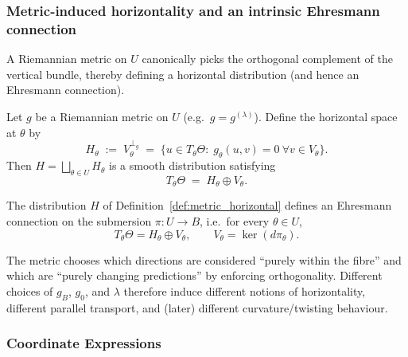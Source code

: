 
\subsubsection{Metric-induced horizontality and an intrinsic Ehresmann connection}

A Riemannian metric on $U$ canonically picks the orthogonal complement of the vertical bundle,
thereby defining a horizontal distribution (and hence an Ehresmann connection).

\begin{gdefn}
\label{def:metric_horizontal}
Let $g$ be a Riemannian metric on $U$ (e.g.\ $g=g^{(\lambda)}$).
Define the horizontal space at $\theta$ by
\[
H_\theta \;:=\; V_\theta^{\perp_g}
\;=\;\{u\in T_\theta\Theta:\; g_\theta(u,v)=0\ \forall v\in V_\theta\}.
\]
Then $H=\bigsqcup_{\theta\in U}H_\theta$ is a smooth distribution satisfying
\[
T_\theta\Theta \;=\; H_\theta \oplus V_\theta.
\]
\end{gdefn}

\begin{gprop}
\label{prop:metric_connection}
The distribution $H$ of Definition~\ref{def:metric_horizontal} defines an Ehresmann connection
on the submersion $\pi:U\to B$, i.e.\ for every $\theta\in U$,
\[
T_\theta\Theta = H_\theta \oplus V_\theta,
\qquad
V_\theta=\ker(d\pi_\theta).
\]
\end{gprop}

The metric chooses which directions are considered ``purely within the fibre'' and which are
``purely changing predictions'' by enforcing orthogonality.  Different choices of $g_B$, $g_0$,
and $\lambda$ therefore induce different notions of horizontality, different parallel transport,
and (later) different curvature/twisting behaviour.

\subsubsection{Coordinate Expressions}

